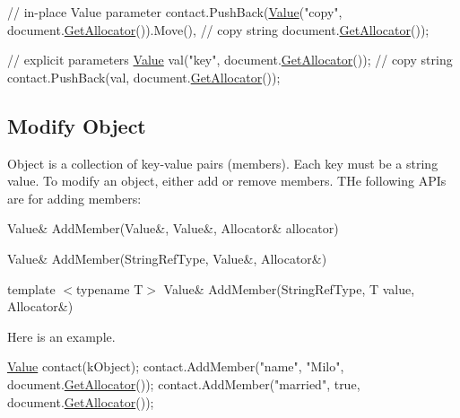 \begin{DoxyCode}
\textcolor{comment}{// in-place Value parameter}
contact.PushBack(\hyperlink{document_8h_a071cf97155ba72ac9a1fc4ad7e63d481}{Value}(\textcolor{stringliteral}{"copy"}, document.\hyperlink{class_generic_document_aa4609d6b19f86aec1a6b96edf2c27686}{GetAllocator}()).Move(), \textcolor{comment}{// copy string}
                 document.\hyperlink{class_generic_document_aa4609d6b19f86aec1a6b96edf2c27686}{GetAllocator}());

\textcolor{comment}{// explicit parameters}
\hyperlink{class_generic_value}{Value} val(\textcolor{stringliteral}{"key"}, document.\hyperlink{class_generic_document_aa4609d6b19f86aec1a6b96edf2c27686}{GetAllocator}()); \textcolor{comment}{// copy string}
contact.PushBack(val, document.\hyperlink{class_generic_document_aa4609d6b19f86aec1a6b96edf2c27686}{GetAllocator}());
\end{DoxyCode}
\hypertarget{md_Commun_Externe_RapidJSON_doc_tutorial.zh-cn_ModifyObject}{}\subsection{Modify Object}\label{md_Commun_Externe_RapidJSON_doc_tutorial.zh-cn_ModifyObject}
Object is a collection of key-\/value pairs (members). Each key must be a string value. To modify an object, either add or remove members. T\+He following A\+P\+Is are for adding members\+:


\begin{DoxyItemize}
\item {\ttfamily Value\& Add\+Member(\+Value\&, Value\&, Allocator\& allocator)}
\item {\ttfamily Value\& Add\+Member(\+String\+Ref\+Type, Value\&, Allocator\&)}
\item {\ttfamily template $<$typename T$>$ Value\& Add\+Member(\+String\+Ref\+Type, T value, Allocator\&)}
\end{DoxyItemize}

Here is an example.


\begin{DoxyCode}
\hyperlink{class_generic_value}{Value} contact(kObject);
contact.AddMember(\textcolor{stringliteral}{"name"}, \textcolor{stringliteral}{"Milo"}, document.\hyperlink{class_generic_document_aa4609d6b19f86aec1a6b96edf2c27686}{GetAllocator}());
contact.AddMember(\textcolor{stringliteral}{"married"}, \textcolor{keyword}{true}, document.\hyperlink{class_generic_document_aa4609d6b19f86aec1a6b96edf2c27686}{GetAllocator}());
\end{DoxyCode}


